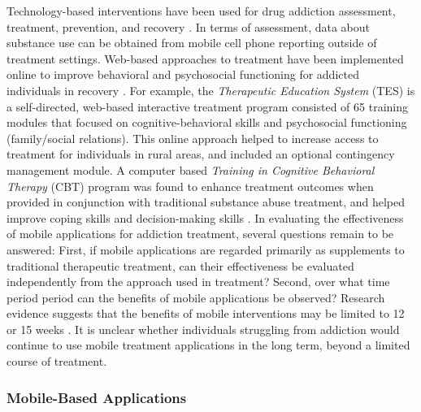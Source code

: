 \documentclass[sigconf]{acmart}
\begin{document}
Technology-based interventions have been used for drug addiction assessment, 
treatment, prevention, and recovery \cite{marsch12}. In terms of assessment, 
data about substance use can be obtained from mobile cell phone reporting 
outside of treatment settings. Web-based approaches to treatment have been 
implemented online to improve behavioral and psychosocial functioning for 
addicted individuals in recovery \cite{marschdallery2012}. For example, the 
{\em Therapeutic Education System} (TES) is a self-directed, web-based 
interactive treatment program consisted of 65 training modules that focused 
on cognitive-behavioral skills and psychosocial functioning (family/social 
relations). This online approach helped to increase access to treatment for 
individuals in rural areas, and included an optional contingency management 
module. A computer based {\em Training in Cognitive Behavioral Therapy} (CBT) 
program was found to enhance treatment outcomes when provided in conjunction 
with traditional substance abuse treatment, and helped improve coping skills 
and decision-making skills \cite{carroll08}. In evaluating the effectiveness 
of mobile applications for addiction treatment, several questions remain to be 
answered: First, if mobile applications are regarded primarily as supplements 
to traditional therapeutic treatment, can their effectiveness be evaluated 
independently from the approach used in treatment? Second, over what time 
period period can the benefits of mobile applications be observed? Research 
evidence suggests that the benefits of mobile interventions may be limited 
to 12 or 15 weeks \cite{swedenson16}. It is unclear whether individuals 
struggling from addiction would continue to use mobile treatment applications 
in the long term, beyond a limited course of treatment.


\subsubsection{Mobile-Based Applications}
\end{document}
